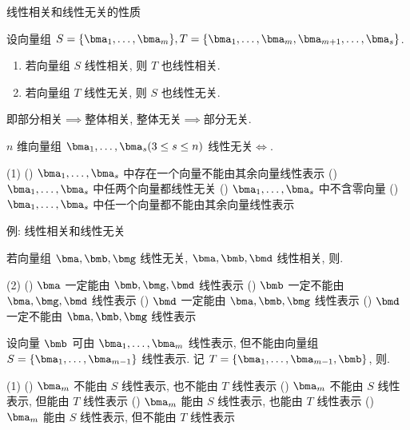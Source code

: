 \begin{frame}{线性相关和线性无关的性质}
	\onslide<+->
	\begin{theorem}
		设向量组 $S=\{\bma_1,\dots,\bma_m\},T=\{\bma_1,\dots,\bma_m,\bma_{m+1},\dots,\bma_s\}$.
		\begin{enumerate}
			\item 若向量组 $S$ 线性相关, 则 $T$ 也线性相关.
			\item 若向量组 $T$ 线性无关, 则 $S$ 也线性无关.
		\end{enumerate}
	\end{theorem}
	\onslide<+->
	即\alert{部分相关$\implies$整体相关, 整体无关$\implies$部分无关}.
	\onslide<+->
	\begin{example}
		$n$ 维向量组 $\bma_1,\dots,\bma_s (3\le s\le n)$ 线性无关$\iff$.
		\begin{taskschoice}(1)
			() $\bma_1,\dots,\bma_s$ 中存在一个向量不能由其余向量线性表示
			() $\bma_1,\dots,\bma_s$ 中任两个向量都线性无关
			() $\bma_1,\dots,\bma_s$ 中不含零向量
			() $\bma_1,\dots,\bma_s$ 中任一个向量都不能由其余向量线性表示
		\end{taskschoice}
	\end{example}
\end{frame}


\begin{frame}{例: 线性相关和线性无关}
	\onslide<+->
	\begin{exercise}
		若向量组 $\bma,\bmb,\bmg$ 线性无关, $\bma,\bmb,\bmd$ 线性相关, 则\fillbrace{\visible<+->{C}}.
		\begin{taskschoice}(2)
			() $\bma$ 一定能由 $\bmb,\bmg,\bmd$ 线性表示
			() $\bmb$ 一定不能由 $\bma,\bmg,\bmd$ 线性表示
			() $\bmd$ 一定能由 $\bma,\bmb,\bmg$ 线性表示
			() $\bmd$ 一定不能由 $\bma,\bmb,\bmg$ 线性表示
		\end{taskschoice}
	\end{exercise}
	\onslide<+->
	\begin{example}
		设向量 $\bmb$ 可由 $\bma_1,\dots,\bma_m$ 线性表示, 但不能由向量组 $S=\{\bma_1,\dots,\bma_{m-1}\}$ 线性表示. 记 $T=\{\bma_1,\dots,\bma_{m-1},\bmb\}$, 则\fillbrace{\visible<+->{B}}.
		\begin{taskschoice}(1)
			() $\bma_m$ 不能由 $S$ 线性表示, 也不能由 $T$ 线性表示
			() $\bma_m$ 不能由 $S$ 线性表示, 但能由 $T$ 线性表示
			() $\bma_m$ 能由 $S$ 线性表示, 也能由 $T$ 线性表示
			() $\bma_m$ 能由 $S$ 线性表示, 但不能由 $T$ 线性表示
		\end{taskschoice}
	\end{example}
\end{frame}


